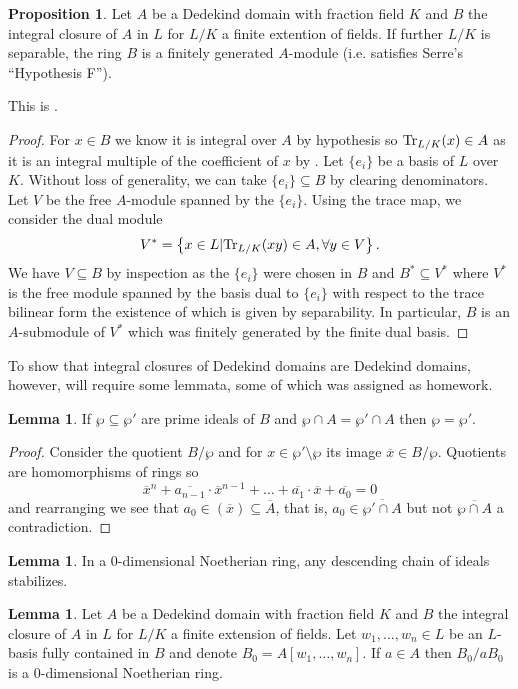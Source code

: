 \documentclass{amsart}
\theoremstyle{definition}
\newtheorem{lemma}[theorem]{Lemma}
\newtheorem{proposition}[theorem]{Proposition}
\numberwithin{equation}{section}
\begin{document}
\begin{proposition}
  Let $A$ be a Dedekind domain with fraction field $K$ and $B$ the integral closure of $A$ in $L$ for $L/K$ a finite extention of fields. If further $L/K$ is separable, the ring $B$ is a finitely generated $A$-module (i.e. satisfies Serre's ``Hypothesis F''). 
\end{proposition}
This is \cite[Ch. 1, \S 4, Prop. 8]{Serre}. 
\begin{proof}
  For $x\in B$ we know it is integral over $A$ by hypothesis so $\mathrm{Tr}_{L/K}(x)\in A$ as it is an integral multiple of the coefficient of $x$ by \cite[\href{https://stacks.math.columbia.edu/tag/0BIH}{0BIH}]{stacks-project}. Let $\{e_{i}\}$ be a basis of $L$ over $K$. Without loss of generality, we can take $\{e_{i}\}\subseteq B$ by clearing denominators. Let $V$ be the free $A$-module spanned by the $\{e_{i}\}$. Using the trace map, we consider the dual module 
  $$V^{*}=\left\{x\in L|\mathrm{Tr}_{L/K}(xy)\in A, \forall y\in V\right\}.$$
  We have $V\subseteq B$ by inspection as the $\{e_{i}\}$ were chosen in $B$ and $B^{*}\subseteq V^{*}$ where $V^{*}$ is the free module spanned by the basis dual to $\{e_{i}\}$ with respect to the trace bilinear form the existence of which is given by separability. In particular, $B$ is an $A$-submodule of $V^{*}$ which was finitely generated by the finite dual basis. 
\end{proof}
To show that integral closures of Dedekind domains are Dedekind domains, however, will require some lemmata, some of which was assigned as homework. 
\begin{lemma}\label{lem: equality of primes in B}
  If $\wp\subseteq\wp'$ are prime ideals of $B$ and $\wp\cap A=\wp'\cap A$ then $\wp=\wp'$. 
\end{lemma}
\begin{proof}
  Consider the quotient $B/\wp$ and for $x\in\wp'\setminus\wp$ its image $\overline{x}\in B/\wp$. Quotients are homomorphisms of rings so
  $$\overline{x}^{n}+\overline{a_{n-1}}\cdot\overline{x}^{n-1}+\dots+\overline{a_{1}}\cdot\overline{x}+\overline{a_{0}}=0$$
  and rearranging we see that $a_{0}\in(\overline{x})\subseteq\overline{A}$, that is, $a_{0}\in\overline{\wp'\cap A}$ but not $\overline{\wp\cap A}$ a contradiction. 
\end{proof}
\begin{lemma}\label{lem:descending chain stabilizes}
  In a 0-dimensional Noetherian ring, any descending chain of ideals stabilizes. 
\end{lemma}
\begin{lemma}\label{lem: ring B0}
  Let $A$ be a Dedekind domain with fraction field $K$ and $B$ the integral closure of $A$ in $L$ for $L/K$ a finite extension of fields. Let $w_{1},\dots,w_{n}\in L$ be an $L$-basis fully contained in $B$ and denote $B_{0}=A[w_{1},\dots,w_{n}]$. If $a\in A$ then $B_{0}/aB_{0}$ is a 0-dimensional Noetherian ring. 
\end{lemma}
\end{document}
